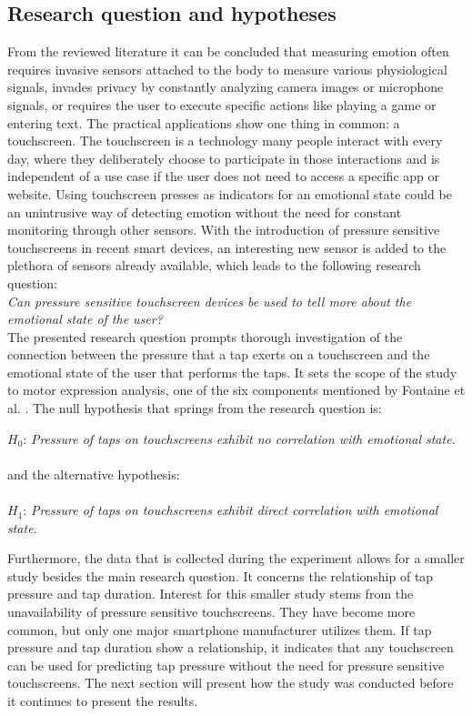 \documentclass{sigchi}
\begin{document}

\subsection{Research question and hypotheses}
From the reviewed literature it can be concluded that measuring emotion often requires invasive sensors attached to the body to measure various physiological signals, invades privacy by constantly analyzing camera images or microphone signals, or requires the user to execute specific actions like playing a game or entering text. The practical applications show one thing in common: a touchscreen. The touchscreen is a technology many people interact with every day, where they deliberately choose to participate in those interactions and is independent of a use case if the user does not need to access a specific app or website. Using touchscreen presses as indicators for an emotional state could be an unintrusive way of detecting emotion without the need for constant monitoring through other sensors. With the introduction of pressure sensitive touchscreens in recent smart devices, an interesting new sensor is added to the plethora of sensors already available, which leads to the following research question:\\

\textit{Can pressure sensitive touchscreen devices be used to tell more about the emotional state of the user?}\\

The presented research question prompts thorough investigation of the connection between the pressure that a tap exerts on a touchscreen and the emotional state of the user that performs the taps. It sets the scope of the study to motor expression analysis, one of the six components mentioned by Fontaine et al. \cite{Fontaine2007}. The null hypothesis that springs from the research question is:

$H_0$: \textit{Pressure of taps on touchscreens exhibit no correlation with emotional state.}
\\\\and the alternative hypothesis:\\\\
$H_1$: \textit{Pressure of taps on touchscreens exhibit direct correlation with emotional state.}

Furthermore, the data that is collected during the experiment allows for a smaller study besides the main research question. It concerns the relationship of tap pressure and tap duration. Interest for this smaller study stems from the unavailability of pressure sensitive touchscreens. They have become more common, but only one major smartphone manufacturer utilizes them. If tap pressure and tap duration show a relationship, it indicates that any touchscreen can be used for predicting tap pressure without the need for pressure sensitive touchscreens. The next section will present how the study was conducted before it continues to present the results.
\end{document}
